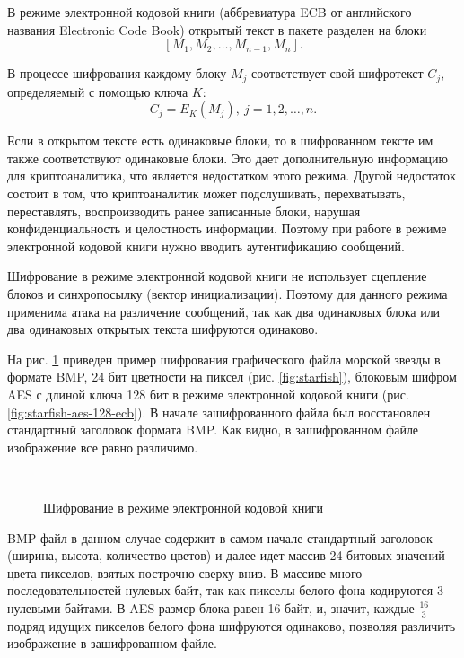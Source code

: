 В режиме электронной кодовой книги (аббревиатура ECB от английского названия Electronic Code Book) открытый текст в пакете разделен на блоки
    \[ \left[ M_1, M_2, \dots, M_{n-1}, M_n \right]. \]

В процессе шифрования каждому блоку $M_j$ соответствует свой шифротекст $C_j$, определяемый с помощью ключа $K$:
    \[ C_j = E_K(M_j), ~ j = 1, 2, \dots, n. \]

Если в открытом тексте есть одинаковые блоки, то в шифрованном тексте им также соответствуют одинаковые блоки. Это дает дополнительную информацию для криптоаналитика, что является недостатком этого режима. Другой недостаток состоит в том, что криптоаналитик может подслушивать, перехватывать, переставлять, воспроизводить ранее записанные блоки, нарушая конфиденциальность и целостность информации. Поэтому при работе в режиме электронной кодовой книги нужно вводить аутентификацию сообщений.

Шифрование в режиме электронной кодовой книги не использует сцепление блоков и синхропосылку (вектор инициализации). Поэтому для данного режима применима атака на различение сообщений, так как два одинаковых блока или два одинаковых открытых текста шифруются одинаково.

На рис. \ref{fig:ecb-demo} приведен пример шифрования графического файла морской звезды в формате BMP, 24 бит цветности на пиксел (рис. \ref{fig:starfish}), блоковым шифром AES с длиной ключа 128 бит в режиме электронной кодовой книги  (рис. \ref{fig:starfish-aes-128-ecb}). В начале зашифрованного файла был восстановлен стандартный заголовок формата BMP. Как видно, в зашифрованном файле изображение все равно различимо.
\begin{figure}[!ht]
    \centering
    ~~~
    \caption{Шифрование в режиме электронной кодовой книги\label{fig:ecb-demo}}
\end{figure}
BMP файл в данном случае содержит в самом начале стандартный заголовок (ширина, высота, количество цветов) и далее идет массив 24-битовых значений цвета пикселов, взятых построчно сверху вниз. В массиве много последовательностей нулевых байт, так как пикселы белого фона кодируются 3 нулевыми байтами. В AES размер блока равен 16 байт, и, значит, каждые $\frac{16}{3}$ подряд идущих пикселов белого фона шифруются одинаково, позволяя различить изображение в зашифрованном файле.

